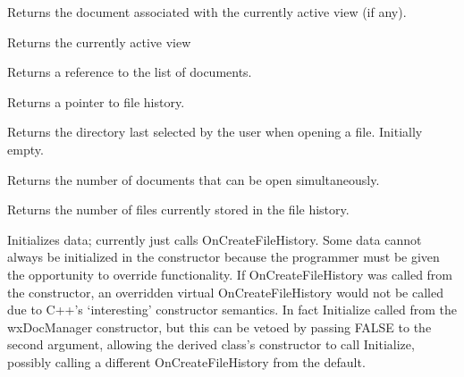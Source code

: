 

Returns the document associated with the currently active view (if any).



Returns the currently active view 



Returns a reference to the list of documents.



Returns a pointer to file history.

\label{wxdocmanagergetlastdirectory}


Returns the directory last selected by the user when opening a file. Initially empty.



Returns the number of documents that can be open simultaneously.



Returns the number of files currently stored in the file history.

\label{wxdocmanagerinitialize}


Initializes data; currently just calls OnCreateFileHistory. Some data cannot
always be initialized in the constructor because the programmer must be given
the opportunity to override functionality. If OnCreateFileHistory was called
from the constructor, an overridden virtual OnCreateFileHistory would not be
called due to C++'s `interesting' constructor semantics. In fact Initialize
 called from the wxDocManager constructor, but this can be
vetoed by passing FALSE to the second argument, allowing the derived class's
constructor to call Initialize, possibly calling a different OnCreateFileHistory
from the default.

